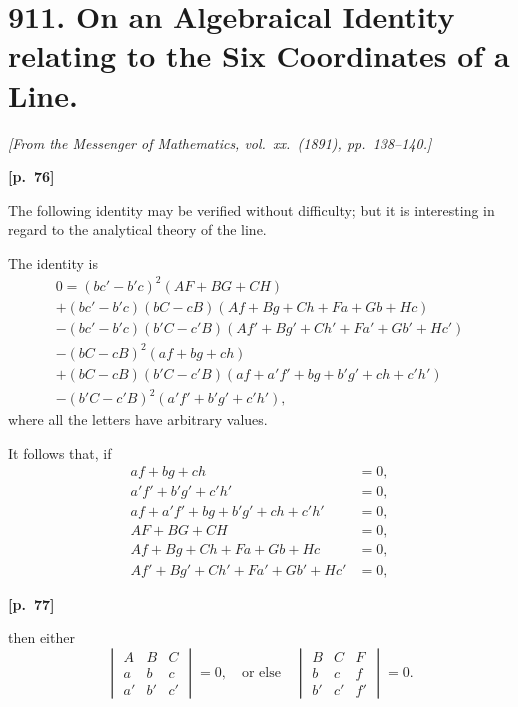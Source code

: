 \documentclass[11pt,a4paper]{book}
\begin{document}
\section*{911. On an Algebraical Identity relating to the Six Coordinates of a Line.}

\noindent\textit{[From the Messenger of Mathematics, vol.\ xx.\ (1891), pp.\ 138--140.]}

\vspace{0.5em}
\noindent\textbf{[p.\ 76]}

The following identity may be verified without difficulty; but it is interesting in regard to the analytical theory of the line.

The identity is
\begin{multline*}
0 = (bc' - b'c)^2(AF + BG + CH) \\
+ (bc' - b'c)(bC - cB)(Af + Bg + Ch + Fa + Gb + Hc) \\
- (bc' - b'c)(b'C - c'B)(Af' + Bg' + Ch' + Fa' + Gb' + Hc') \\
- (bC - cB)^2(af + bg + ch) \\
+ (bC - cB)(b'C - c'B)(af + a'f' + bg + b'g' + ch + c'h') \\
- (b'C - c'B)^2(a'f' + b'g' + c'h'),
\end{multline*}
where all the letters have arbitrary values.

It follows that, if
\begin{align*}
af + bg + ch &= 0, \\
a'f' + b'g' + c'h' &= 0, \\
af + a'f' + bg + b'g' + ch + c'h' &= 0, \\
AF + BG + CH &= 0, \\
Af + Bg + Ch + Fa + Gb + Hc &= 0, \\
Af' + Bg' + Ch' + Fa' + Gb' + Hc' &= 0,
\end{align*}

\vspace{0.5em}
\noindent\textbf{[p.\ 77]}

then either
$$
\begin{vmatrix} A & B & C \\ a & b & c \\ a' & b' & c' \end{vmatrix} = 0,
\quad \text{or else} \quad
\begin{vmatrix} B & C & F \\ b & c & f \\ b' & c' & f' \end{vmatrix} = 0.
$$
\end{document}
